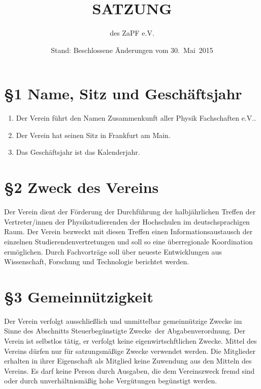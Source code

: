 \documentclass[ngerman]{article}
\begin{document}
\title{SATZUNG}
\date{Stand: Beschlossene Änderungen vom 30.~Mai~2015}

\author{des \textquotedbl{}ZaPF
e.V.\textquotedbl{}}

\maketitle



\section*{§1 Name, Sitz und Geschäftsjahr}
\begin{enumerate}
\item Der Verein führt den Namen \glqq Zusammenkunft aller Physik Fachschaften e.V.\grqq.
\item Der Verein hat seinen Sitz in Frankfurt am Main.
\item Das Geschäftsjahr ist das Kalenderjahr.
\end{enumerate}


\section*{§2 Zweck des Vereins}
Der Verein dient der Förderung der Durchführung der halbjährlichen Treffen der Vertreter/innen der Physikstudierenden der Hochschulen im deutschsprachigen Raum.
Der Verein bezweckt mit diesen Treffen einen Informationsaustausch der einzelnen Studierendenvertretungen und soll so eine überregionale Koordination ermöglichen. Durch Fachvorträge soll über neueste Entwicklungen aus Wissenschaft, Forschung und Technologie berichtet werden.


\section*{§3 Gemeinnützigkeit}
Der Verein verfolgt ausschließlich und unmittelbar gemeinnützige Zwecke im Sinne des Abschnitts \glqq Steuerbegünstigte Zwecke\grqq\ der Abgabenverordnung. Der Verein ist selbstlos tätig, er verfolgt keine eigenwirtschftlichen Zwecke. Mittel des Vereins dürfen nur für satzungsmäßige Zwecke verwendet werden. Die Mitglieder erhalten in
ihrer Eigenschaft als Mitglied keine Zuwendung aus den Mitteln des Vereins. Es darf keine Person durch Ausgaben, die dem Vereinszweck fremd sind oder durch unverhältnismäßig hohe Vergütungen begünstigt werden.
\end{document}
